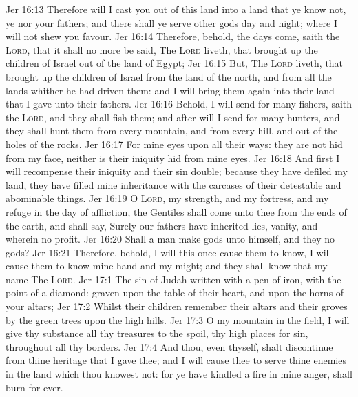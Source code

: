 \vs Jer 16:13 Therefore will I cast you out of this land into a land that ye know not,  ye nor your fathers; and there shall ye serve other gods day and night; where I will not shew you favour.
\vs Jer 16:14 Therefore, behold, the days come, saith the \textsc{Lord}, that it shall no more be said, The \textsc{Lord} liveth, that brought up the children of Israel out of the land of Egypt;
\vs Jer 16:15 But, The \textsc{Lord} liveth, that brought up the children of Israel from the land of the north, and from all the lands whither he had driven them: and I will bring them again into their land that I gave unto their fathers.
\vs Jer 16:16 Behold, I will send for many fishers, saith the \textsc{Lord}, and they shall fish them; and after will I send for many hunters, and they shall hunt them from every mountain, and from every hill, and out of the holes of the rocks.
\vs Jer 16:17 For mine eyes  upon all their ways: they are not hid from my face, neither is their iniquity hid from mine eyes.
\vs Jer 16:18 And first I will recompense their iniquity and their sin double; because they have defiled my land, they have filled mine inheritance with the carcases of their detestable and abominable things.
\vs Jer 16:19 O \textsc{Lord}, my strength, and my fortress, and my refuge in the day of affliction, the Gentiles shall come unto thee from the ends of the earth, and shall say, Surely our fathers have inherited lies, vanity, and  wherein  no profit.
\vs Jer 16:20 Shall a man make gods unto himself, and they  no gods?
\vs Jer 16:21 Therefore, behold, I will this once cause them to know, I will cause them to know mine hand and my might; and they shall know that my name  The \textsc{Lord}.
\vs Jer 17:1 The sin of Judah  written with a pen of iron,  with the point of a diamond:  graven upon the table of their heart, and upon the horns of your altars;
\vs Jer 17:2 Whilst their children remember their altars and their groves by the green trees upon the high hills.
\vs Jer 17:3 O my mountain in the field, I will give thy substance  all thy treasures to the spoil,  thy high places for sin, throughout all thy borders.
\vs Jer 17:4 And thou, even thyself, shalt discontinue from thine heritage that I gave thee; and I will cause thee to serve thine enemies in the land which thou knowest not: for ye have kindled a fire in mine anger,  shall burn for ever.
